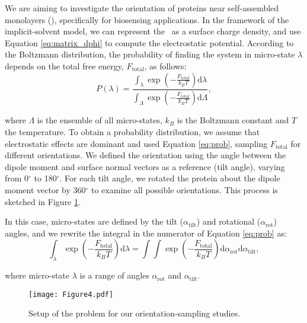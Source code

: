 
We are aiming to investigate the orientation of proteins near self-assembled monolayers (\sam), specifically for biosensing applications. In the framework of the implicit-solvent model, we can represent the \sam\ as a surface charge density, and use Equation \eqref{eq:matrix_dphi} to compute the electrostatic potential. 
According to the Boltzmann distribution, the probability of finding the system in micro-state $\lambda$ depends on the total free energy, $F_\text{total}$, as follows:
%
\begin{equation} \label{eq:prob}
P(\lambda) = \frac{\int_{\lambda} \exp \left(-\frac{F_\text{total}}{k_B T} \right) \text{d} \lambda}{\int_{\Lambda} \exp \left(-\frac{F_\text{total}}{k_B T} \right) \text{d} \Lambda},
\end{equation} 

\noindent where $\Lambda$ is the ensemble of all micro-states, $k_B$ is the Boltzmann constant and $T$ the temperature. To obtain a probability distribution, we assume that electrostatic effects are dominant and used Equation \eqref{eq:prob}, sampling $F_\text{total}$ for different orientations. We defined the orientation using the angle between the dipole moment and surface normal vectors as a reference (tilt angle), varying from 0$^\circ$ to 180$^\circ$. For each tilt angle, we rotated the protein about the dipole moment vector by 360$^\circ$ to examine all possible orientations. This process is sketched in Figure \ref{fig:1pgb_orientation}.

In this case, micro-states are defined by the tilt ($\alpha_{\text{tilt}}$) and rotational ($\alpha_{\text{rot}}$) angles, and we rewrite the integral in the numerator of Equation \eqref{eq:prob} as:
%
\begin{equation} \label{eq:prob_angle}
\int_{\lambda} \exp \left(-\frac{F_\text{total}}{k_B T} \right) \text{d} \lambda = \int \int \exp \left(-\frac{F_\text{total}}{k_B T} \right) \text{d} \alpha_{\text{rot}} \text{d} \alpha_{\text{tilt}},
\end{equation}

\noindent where micro-state $\lambda$ is a range of angles $\alpha_{\text{rot}}$ and $\alpha_{\text{tilt}}$. 


\begin{figure}%
   \centering
   \texttt{[image: Figure4.pdf]}
   \caption{Setup of the problem for our orientation-sampling studies.}
   \label{fig:1pgb_orientation}
\end{figure}

